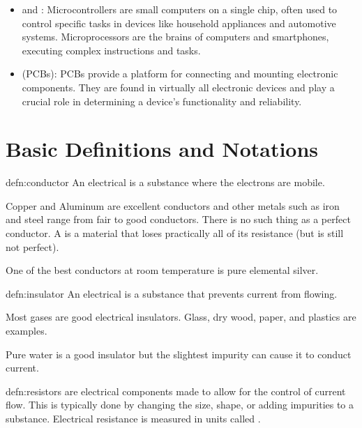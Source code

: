 \begin{itemize}
    \item {} and : Microcontrollers are small computers on a single chip, often used to control specific tasks in devices like household appliances and automotive systems. Microprocessors are the brains of computers and smartphones, executing complex instructions and tasks.

    \item {} (PCBs): PCBs provide a platform for connecting and mounting electronic components. They are found in virtually all electronic devices and play a crucial role in determining a device's functionality and reliability.
\end{itemize}


\section{Basic Definitions and Notations}

\begin{defn}[Conductors]{defn:conductor}
An electrical  is a substance where the electrons are mobile.
\end{defn}

Copper and Aluminum are excellent conductors and other metals such as iron and steel range from fair to good conductors. There is no such thing as a perfect conductor. A  is a material that loses practically all of its resistance (but is still not perfect).

\begin{interestnote}
One of the best conductors at room temperature is pure elemental silver. 
\end{interestnote}

\begin{defn}[Insulators]{defn:insulator}
An electrical  is a substance that prevents current from flowing.
\end{defn}

Most gases are good electrical insulators. Glass, dry wood, paper, and plastics are examples. 

\begin{interestnote}
Pure water is a good insulator but the slightest impurity can cause it to conduct current.
\end{interestnote}

\begin{defn}[Resistors]{defn:resistors}
 are electrical components made to allow for the control of current flow. This is typically done by changing the size, shape, or adding impurities to a substance. Electrical resistance is measured in units called .
\end{defn}

